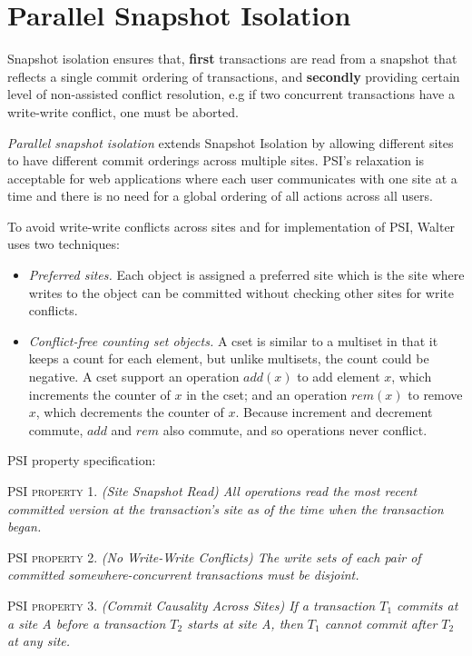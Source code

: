 \documentclass[a4paper]{article}
\begin{document}
\section{Parallel Snapshot Isolation}
Snapshot isolation ensures that, \textbf{first} transactions are read from a snapshot that reflects a single commit ordering of transactions, and \textbf{secondly} providing certain level of non-assisted conflict resolution, e.g if two concurrent transactions have a write-write conflict, one must be aborted.
 
\textit{Parallel snapshot isolation} extends Snapshot Isolation by allowing different sites to have different commit orderings across multiple sites. PSI's relaxation is acceptable for web applications where each user communicates with one site at a time and there is no need for a global ordering of all actions across all users. 

To avoid write-write conflicts across sites and for implementation of PSI, Walter uses two techniques:
\begin{itemize}
\item \textit{Preferred sites.} Each object is assigned a preferred site which is the site where writes to the object can be committed without checking other sites for write conflicts.
\item \textit{Conflict-free counting set objects.} A cset is similar to a multiset in that it keeps a count for each element, but unlike multisets, the count could be negative. A cset support an operation $add(x)$ to add element $x$, which increments the counter of $x$ in the cset; and an operation $rem(x)$ to remove $x$, which decrements the counter of $x$. Because increment and decrement commute, $add$ and $rem$ also commute, and so operations never conflict. 
\end{itemize}

PSI property specification:

PSI \textsc{property} 1. \textit{(Site Snapshot Read) All operations read the most recent committed version at the transaction's site as of the time when the transaction began.}

PSI \textsc{property} 2. \textit{(No Write-Write Conflicts) The write sets of each pair of committed somewhere-concurrent transactions must be disjoint.}

PSI \textsc{property} 3. \textit{(Commit Causality Across Sites) If a transaction $T_{1}$ commits at a site A before a transaction $T_{2}$ starts at site A, then $T_{1}$ cannot commit after $T_{2}$ at any site.}
\end{document}

